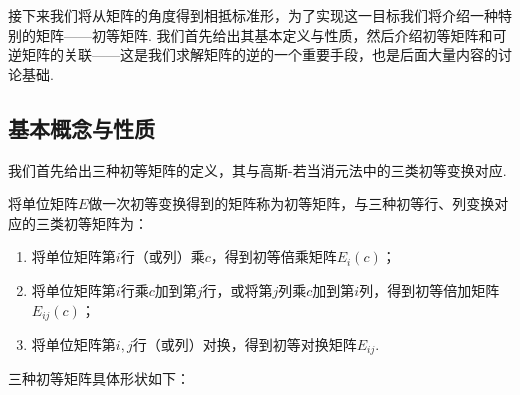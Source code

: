 接下来我们将从矩阵的角度得到相抵标准形，为了实现这一目标我们将介绍一种特别的矩阵——初等矩阵. 我们首先给出其基本定义与性质，然后介绍初等矩阵和可逆矩阵的关联——这是我们求解矩阵的逆的一个重要手段，也是后面大量内容的讨论基础.

\subsection{基本概念与性质}

我们首先给出三种初等矩阵的定义，其与高斯-若当消元法中的三类初等变换对应.
\begin{definition}{}{}
    将单位矩阵$E$做一次初等变换得到的矩阵称为初等矩阵，与三种初等行、列变换对应的三类初等矩阵为：
    \begin{enumerate}
        \item 将单位矩阵第$i$行（或列）乘$c$，得到初等倍乘矩阵$E_i(c)$；

        \item 将单位矩阵第$i$行乘$c$加到第$j$行，或将第$j$列乘$c$加到第$i$列，得到初等倍加矩阵$E_{ij}(c)$；

        \item 将单位矩阵第$i,j$行（或列）对换，得到初等对换矩阵$E_{ij}$.
    \end{enumerate}
\end{definition}
三种初等矩阵具体形状如下：

